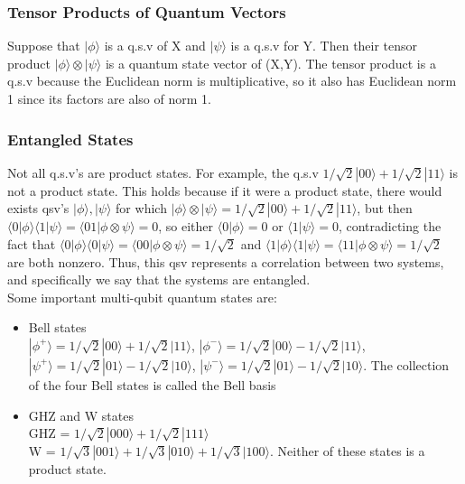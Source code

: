\documentclass{amsart}
\begin{document}
\subsubsection*{Tensor Products of Quantum Vectors}
Suppose that $ |\phi \rangle $ is a q.s.v of X and $ |\psi \rangle $ is a q.s.v for Y. Then
their tensor product $ |\phi\rangle \otimes |\psi\rangle $ is a quantum state vector of (X,Y).
The tensor product is a q.s.v because the Euclidean norm is multiplicative, so it also has
Euclidean norm 1 since its factors are also of norm 1. \\
\subsubsection*{Entangled States}
Not all q.s.v's are product states. For example, the q.s.v
$ 1/\sqrt{2}|00\rangle + 1/\sqrt{2}|11\rangle $ is not a product state. This holds because if
it were a product state, there would exists qsv's $ |\phi\rangle, |\psi \rangle $ for which
$ |\phi \rangle \otimes |\psi \rangle = 1/\sqrt{2}|00\rangle + 1/\sqrt{2}|11\rangle $, but
then $ \langle 0|\phi \rangle \langle 1|\psi \rangle = \langle 01|\phi \otimes \psi \rangle =
0 $, so either $ \langle 0|\phi \rangle = 0 $ or $ \langle 1|\psi \rangle = 0 $, contradicting
the fact that $ \langle 0|\phi \rangle \langle 0|\psi \rangle = \langle00|\phi \otimes \psi 
\rangle = 1/\sqrt{2} $ and $ \langle1|\phi \rangle \langle1| \psi \rangle = \langle 11|\phi
\otimes \psi \rangle = 1/\sqrt{2} $ are both nonzero. Thus, this qsv represents a correlation
between two systems, and specifically we say that the systems are entangled. \\
Some important multi-qubit quantum states are:
\begin{itemize}
    \item Bell states \\
$ |\phi^+ \rangle = 1/\sqrt{2} | 00 \rangle + 1/\sqrt{2}|11 \rangle $,
$ |\phi^- \rangle = 1/\sqrt{2} | 00 \rangle - 1/\sqrt{2}|11 \rangle $, \\
$ |\psi^+ \rangle = 1/\sqrt{2} | 01 \rangle - 1/\sqrt{2}|10 \rangle $,
$ |\psi^- \rangle = 1/\sqrt{2} | 01 \rangle - 1/\sqrt{2}|10 \rangle $. The collection of the
four Bell states is called the Bell basis
\item GHZ and W states \\
    GHZ = $ 1/\sqrt{2}|000\rangle + 1/\sqrt{2}|111\rangle $ \\
W = $ 1/\sqrt{3}|001\rangle + 1/\sqrt{3}|010\rangle + 1/\sqrt{3}|100\rangle $.
Neither of these states is a product state.
\end{itemize}
\end{document}

